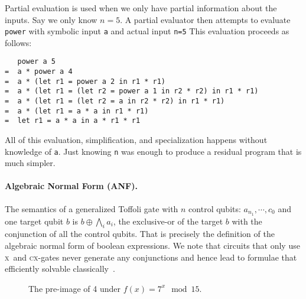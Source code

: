 \documentclass[sigplan]{acmart}
\newcommand{\h}[1]{\texttt{#1}}
\newcommand{\x}{\textsc{x}}
\newcommand{\cx}{\textsc{cx}}
\begin{document}
Partial evaluation is used when we only have partial information about
the inputs. Say we only know $n=5$. A partial evaluator then attempts
to evaluate \h{power} with symbolic input \h{a} and actual input
\h{n=5}  This evaluation proceeds as follows:
\begin{verbatim}
   power a 5 
=  a * power a 4 
=  a * (let r1 = power a 2 in r1 * r1)
=  a * (let r1 = (let r2 = power a 1 in r2 * r2) in r1 * r1)
=  a * (let r1 = (let r2 = a in r2 * r2) in r1 * r1)
=  a * (let r1 = a * a in r1 * r1)
=  let r1 = a * a in a * r1 * r1
\end{verbatim}
All of this evaluation, simplification, and specialization happens
without knowledge of \h{a}. Just knowing \h{n} was enough to
produce a residual program that is much simpler. 

\paragraph*{Algebraic Normal Form (ANF).}
The semantics of a generalized Toffoli gate with $n$ control qubits:
$a_{n_1},\cdots,c_0$ and one target qubit $b$ is $b \oplus \bigwedge_i
a_i$, the exclusive-or of the target $b$ with the conjunction of all
the control qubits. That is precisely the definition of the algebraic
normal form of boolean expressions. We note that circuits that only
use \x\ and \cx-gates never generate any conjunctions and hence lead
to formulae that efficiently solvable
classically~\cite{10.5555/35517,TOKAREVA20151}.

\begin{wrapfigure}{r}{7cm}
\begin{center}
\end{center}
\caption{\label{fig:preimage}The pre-image of 4 under $f(x) = 7^x \mod 15$.}
\end{wrapfigure}
\end{document}
